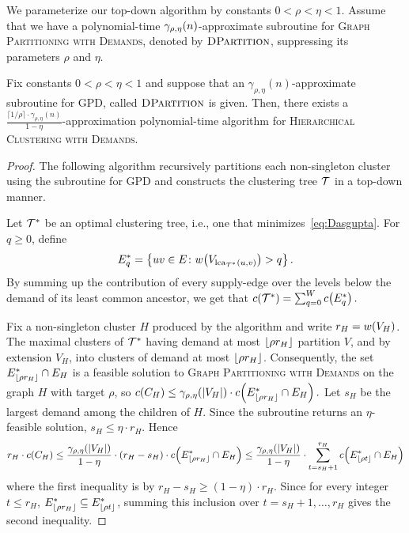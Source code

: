 We parameterize our top-down algorithm by constants $0<\rho<\eta<1$. Assume that we have a polynomial-time $\gamma_{\rho,\eta}\mathopen{}\left( n \right)$-approximate subroutine for \textsc{Graph Partitioning with Demands}, denoted by $\textsc{DPartition}$, suppressing its parameters $\rho$ and $\eta$.

\begin{theorem}\label{thm:hc-gpd-transfer}
    Fix constants $0<\rho<\eta<1$ and suppose that an $\gamma_{\rho,\eta}(n)$-approximate subroutine for GPD, called $\textsc{DPartition}$ is given. Then, there exists a $\frac{\lceil1/\rho\rceil\cdot\gamma_{\rho,\eta}(n)}{1-\eta}$-approximation polynomial-time algorithm for \textsc{Hierarchical Clustering with Demands}.
\end{theorem}
\begin{proof}
    The following algorithm recursively partitions each non-singleton cluster using the subroutine for GPD and constructs the clustering tree $\mathcal{T}$ in a top-down manner.
    
\medskip

\medskip

    Let $\mathcal{T}^*$ be an optimal clustering tree, i.e., one that minimizes~\eqref{eq:Dasgupta}. For $q\geq0$, define
    \[
        E_q^*
        =\left\{
            uv\in E\colon
            w\mathopen{}\left( V_{\operatorname{lca}_{\mathcal{T}^*}(u,v)} \right)>q
        \right\}.
    \]
    By summing up the contribution of every supply-edge over the levels below the demand of its least common ancestor, we get that $
        c\mathopen{}\left( \mathcal{T}^* \right)
        =\sum_{q=0}^{W}c\mathopen{}\left( E_q^* \right).
    $

    Fix a non-singleton cluster $H$ produced by the algorithm and 
    write $r_H=w\mathopen{}\left( V_H \right)$. The maximal clusters of $\mathcal{T}^*$ having demand at most $\mathopen{}\left\lfloor \rho r_H \right\rfloor$ partition $V$, and by extension $V_H$, into clusters of demand at most $\mathopen{}\left\lfloor \rho r_H \right\rfloor$.
    Consequently, the set $E_{\mathopen{}\left\lfloor \rho r_H \right\rfloor}^*\cap E_H$ is a feasible solution to \textsc{Graph Partitioning with Demands} on the graph $H$ with target $\rho$, so $
        c\mathopen{}\left( C_H \right)\leq \gamma_{\rho,\eta}\mathopen{}\left( \mathopen{}\left| V_H \right| \right) \cdot c\mathopen{}\left( E_{\mathopen{}\left\lfloor \rho r_H \right\rfloor}^*\cap E_H \right).$
    Let $s_H$ be the largest demand among the children of $H$. Since the subroutine returns an $\eta$-feasible solution, $s_H\leq\eta \cdot r_H$. Hence
    \[
        r_H\cdot c\mathopen{}\left( C_H \right)
        \leq\frac{\gamma_{\rho,\eta}\mathopen{}\left( \mathopen{}\left| V_H \right| \right)}{1-\eta}
            \cdot\mathopen{}\left( r_H-s_H \right)\cdot c\mathopen{}\left( E_{\mathopen{}\left\lfloor \rho r_H \right\rfloor}^*\cap E_H \right) \leq\frac{\gamma_{\rho,\eta}\mathopen{}\left( \mathopen{}\left| V_H \right| \right)}{1-\eta}\cdot
            \sum_{t=s_H+1}^{r_H}c\mathopen{}\left( E_{\mathopen{}\left\lfloor \rho t \right\rfloor}^*\cap E_H \right)
    \]
    where the first inequality is by $r_H-s_H\geq(1-\eta)\cdot r_H$. Since for every integer $t\leq r_H$, $E_{\mathopen{}\left\lfloor \rho r_H \right\rfloor}^*\subseteq E_{\mathopen{}\left\lfloor \rho t \right\rfloor}^*$, summing this inclusion over $t=s_H+1,\ldots,r_H$ gives the second inequality.


\end{proof}
